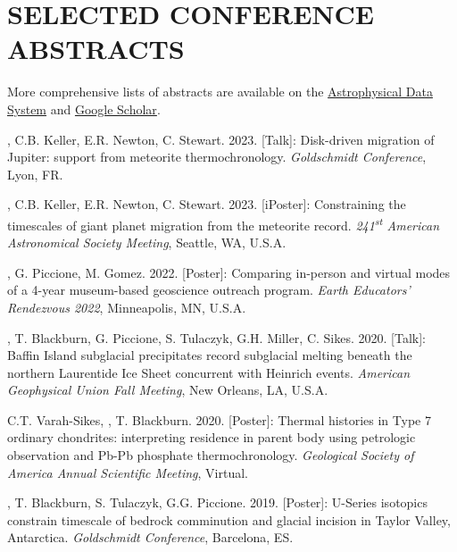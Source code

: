 \section{SELECTED CONFERENCE ABSTRACTS}

More comprehensive lists of abstracts are available on the \href{https://ui.adsabs.harvard.edu/search/q=author%3A%22Edwards%2C%20Graham%20Harper%22}{Astrophysical Data System} and \href{https://scholar.google.com/citations?user=KHLOvgcAAAAJ&hl=en}{Google Scholar}.

\begin{etaremune} [itemsep=4pt, leftmargin=3ex]
  
  \item \ghedwards, C.B. Keller, E.R. Newton, C. Stewart. 2023. [Talk]: Disk-driven migration of Jupiter: support from meteorite thermochronology. \textit{Goldschmidt Conference}, Lyon, FR. 
  
  \item \ghedwards, C.B. Keller,  E.R. Newton, C. Stewart. 2023. [iPoster]: Constraining the timescales of giant planet migration from the meteorite record. \textit{241\textsuperscript{st} American Astronomical Society Meeting}, Seattle, WA, U.S.A.
 
  \item \ghedwards, G. Piccione, M. Gomez. 2022. [Poster]: Comparing in-person and virtual modes of a 4-year museum-based geoscience outreach program. \textit{Earth Educators' Rendezvous 2022}, Minneapolis, MN, U.S.A.
  
  \item \ghedwards, T. Blackburn, G. Piccione, S. Tulaczyk, G.H. Miller, C. Sikes. 2020. [Talk]: Baffin Island subglacial precipitates record subglacial melting beneath the northern Laurentide Ice Sheet concurrent with Heinrich events. \textit{American Geophysical Union Fall Meeting}, New Orleans, LA, U.S.A.
  
  \item C.T. Varah-Sikes, \ghedwards, T. Blackburn. 2020. [Poster]: Thermal histories in Type 7 ordinary chondrites: interpreting residence in parent body using petrologic observation and Pb-Pb phosphate thermochronology. \textit{Geological Society of America Annual Scientific Meeting}, Virtual.
  
  \item  \ghedwards, T. Blackburn, S. Tulaczyk, G.G. Piccione. 2019. [Poster]: U-Series isotopics constrain timescale of bedrock comminution and glacial incision in Taylor Valley, Antarctica. \textit{Goldschmidt Conference}, Barcelona, ES.


\end{etaremune}
